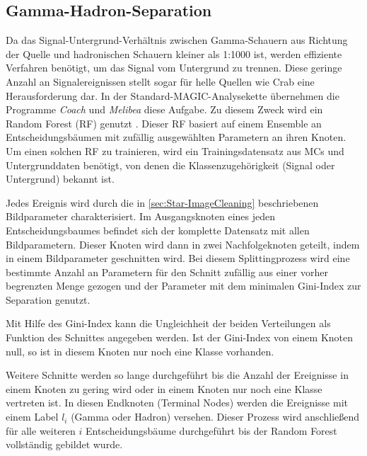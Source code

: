 \subsection{Gamma-Hadron-Separation}
Da das Signal-Untergrund-Verhältnis zwischen Gamma-Schauern aus Richtung der Quelle und hadronischen Schauern kleiner als 1:1000 ist, werden effiziente Verfahren benötigt, um das Signal vom Untergrund zu trennen.\cite{Bock}
Diese geringe Anzahl an Signalereignissen stellt sogar für helle Quellen wie Crab eine Herausforderung dar.
In der Standard-MAGIC-Analysekette übernehmen die Programme \textit{Coach} und \textit{Melibea} diese Aufgabe. 
Zu diesem Zweck wird ein Random Forest (RF) genutzt \cite{RandomForestForMAGIC}.
Dieser RF basiert auf einem Ensemble an Entscheidungsbäumen mit zufällig ausgewählten Parametern an ihren Knoten.
Um einen solchen RF zu trainieren, wird ein Trainingsdatensatz aus MCs und Untergrunddaten benötigt, von denen die Klassenzugehörigkeit (Signal oder Untergrund) bekannt ist.

Jedes Ereignis wird durch die in \autoref{sec:Star-ImageCleaning} beschriebenen Bildparameter charakterisiert.
Im Ausgangsknoten eines jeden Entscheidungsbaumes befindet sich der komplette Datensatz mit allen Bildparametern.
Dieser Knoten wird dann in zwei Nachfolgeknoten geteilt, indem in einem Bildparameter geschnitten wird.
Bei diesem Splittingprozess wird eine bestimmte Anzahl an Parametern für den Schnitt zufällig aus einer vorher begrenzten Menge gezogen und der Parameter mit dem minimalen Gini-Index zur Separation genutzt.\cite{RandomForestForMAGIC}

Mit Hilfe des Gini-Index kann die Ungleichheit der beiden Verteilungen als Funktion des Schnittes angegeben werden.
Ist der Gini-Index von einem Knoten null, so ist in diesem Knoten nur noch eine Klasse vorhanden.\cite{RandomForestForMAGIC}

Weitere Schnitte werden so lange durchgeführt bis die Anzahl der Ereignisse in einem Knoten zu gering wird oder in einem Knoten nur noch eine Klasse vertreten ist.
In diesen Endknoten (Terminal Nodes) werden die Ereignisse mit einem Label $l_i$ (Gamma oder Hadron) versehen. 
Dieser Prozess wird anschließend für alle weiteren $i$ Entscheidungsbäume durchgeführt bis der Random Forest vollständig gebildet wurde.\cite{RandomForestForMAGIC}

